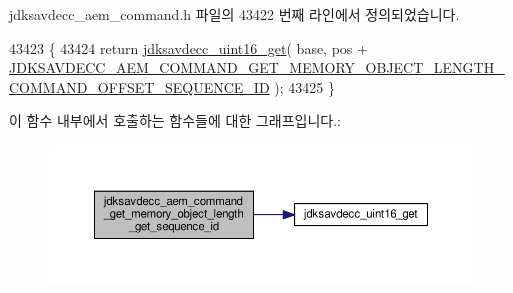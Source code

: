 jdksavdecc\+\_\+aem\+\_\+command.\+h 파일의 43422 번째 라인에서 정의되었습니다.


\begin{DoxyCode}
43423 \{
43424     \textcolor{keywordflow}{return} \hyperlink{group__endian_ga3fbbbc20be954aa61e039872965b0dc9}{jdksavdecc\_uint16\_get}( base, pos + 
      \hyperlink{group__command__get__memory__object__length_gafe050f07f7b965dc2606f7140b97c0fd}{JDKSAVDECC\_AEM\_COMMAND\_GET\_MEMORY\_OBJECT\_LENGTH\_COMMAND\_OFFSET\_SEQUENCE\_ID}
       );
43425 \}
\end{DoxyCode}


이 함수 내부에서 호출하는 함수들에 대한 그래프입니다.\+:
\nopagebreak
\begin{figure}[H]
\begin{center}
\leavevmode
\includegraphics[width=350pt]{group__command__get__memory__object__length_gaa13d71b37fc8d7408dd283dcdf354ab5_cgraph}
\end{center}
\end{figure}


